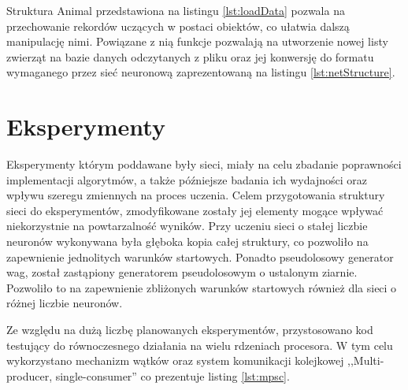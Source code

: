 \documentclass[12pt,twoside]{article}
\begin{document}
\begin{lstlisting}[language=Rust,caption=Moduł odpowiedzialny za załadowanie oraz przygotowanie danych,label={lst:loadData}]
\end{lstlisting}

Struktura Animal przedstawiona na listingu \ref{lst:loadData} pozwala na przechowanie rekordów uczących w postaci obiektów, co ułatwia dalszą manipulację nimi.
Powiązane z nią funkcje pozwalają na utworzenie nowej listy zwierząt na bazie danych odczytanych z pliku oraz jej konwersję do formatu wymaganego przez sieć neuronową zaprezentowaną na listingu \ref{lst:netStructure}.


\section{Eksperymenty}
Eksperymenty którym poddawane były sieci, miały na celu zbadanie poprawności implementacji algorytmów, a także późniejsze badania ich wydajności oraz wpływu szeregu zmiennych na proces uczenia.
Celem przygotowania struktury sieci do eksperymentów, zmodyfikowane zostały jej elementy mogące wpływać niekorzystnie na powtarzalność wyników.
Przy uczeniu sieci o stałej liczbie neuronów wykonywana była głęboka kopia całej struktury, co pozwoliło na zapewnienie jednolitych warunków startowych.
Ponadto pseudolosowy generator wag, został zastąpiony generatorem pseudolosowym o ustalonym ziarnie.
Pozwoliło to na zapewnienie zbliżonych warunków startowych również dla sieci o różnej liczbie neuronów.

Ze względu na dużą liczbę planowanych eksperymentów, przystosowano kod testujący do równoczesnego działania na wielu rdzeniach procesora.
W tym celu wykorzystano mechanizm wątków oraz system komunikacji kolejkowej ,,Multi-producer, single-consumer'' co prezentuje listing \ref{lst:mpsc}.
\end{document}
